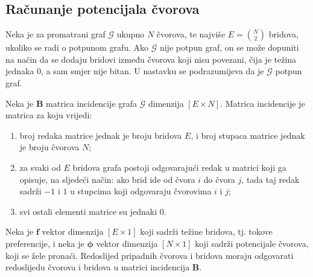 \documentclass[lmodern, utf8, diplomski, numeric]{fer}
\newcommand{\matr}[1]{\mathbold{#1}}
\newcommand{\graph}[1]{\mathcal{#1}}
\newcommand{\q}{\left}
\newcommand{\w}{\right}
\begin{document}
  \subsection{Računanje potencijala čvorova}
  \label{sub:potential}
  Neka je za promatrani graf $\graph{G}$ ukupno $N$ čvorova, te najviše $E = \binom{N}{2}$ bridova, ukoliko se radi o potpunom grafu.
  Ako $\graph{G}$ nije potpun graf, on se može dopuniti na način da se dodaju bridovi između čvorova koji nisu povezani, čija je težina jednaka 0, a sam smjer nije bitan.
  U nastavku se podrazumijeva da je $\graph{G}$ potpun graf.
  
  Neka je $\matr{B}$ matrica incidencije grafa $\graph{G}$ dimenzija $\q[E \times N\w]$.
  Matrica incidencije je matrica za koju vrijedi:
  \begin{enumerate}
    \item broj redaka matrice jednak je broju bridova $E$, i broj stupaca matrice jednak je broju čvorova $N$;
    \item za svaki od $E$ bridova grafa postoji odgovarajući redak u matrici koji ga opisuje, na sljedeći način: ako brid ide od čvora $i$ do čvora $j$, tada taj redak sadrži $-1$ i $1$ u stupcima koji odgovaraju čvorovima $i$ i $j$;
    \item svi ostali elementi matrice su jednaki 0.
  \end{enumerate}
  Neka je $\matr{f}$ vektor dimenzija $\q[E \times 1\w]$ koji sadrži težine bridova, tj. tokove preferencije,
  i neka je $\matr{\phi}$ vektor dimenzija $\q[N \times 1\w]$ koji sadrži potencijale čvorova, koji se žele pronaći.
  Redoslijed pripadnih čvorova i bridova moraju odgovarati redoslijedu čvorova i bridova u matrici incidencija $\matr{B}$.
  
\end{document}
